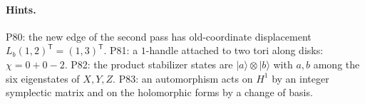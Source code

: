 \documentclass[11pt]{article}
\begin{document}
\paragraph{Hints.} P80: the new edge of the second pass has old-coordinate displacement $L_b(1,2)^{\mathsf T} = (1,3)^{\mathsf T}$. P81: a $1$-handle attached to two tori along disks: $\chi = 0+0-2$. P82: the product stabilizer states are $|a\rangle\otimes|b\rangle$ with $a,b$ among the six eigenstates of $X,Y,Z$. P83: an automorphism acts on $H^1$ by an integer symplectic matrix and on the holomorphic forms by a change of basis.
\end{document}
